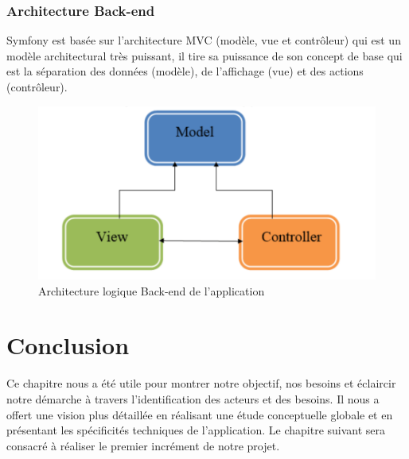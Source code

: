 \subsubsection{Architecture Back-end}

Symfony est basée sur l'architecture MVC (modèle, vue et contrôleur) qui est  
un modèle architectural très puissant, il
tire sa puissance de son concept de base qui est la séparation des données (modèle), de
l'affichage (vue) et des actions (contrôleur).
	\begin{figure}[H]
	\centering
	\includegraphics[scale=0.5]{archisym.PNG}
	\caption{Architecture logique Back-end de l'application}
	\label{Architecture logique Back-end de l'application}
\end{figure} 

\section{Conclusion}
Ce chapitre nous a été utile pour montrer notre objectif, nos besoins et éclaircir notre
démarche à travers l'identification des acteurs et des besoins. Il nous a offert une vision plus détaillée en réalisant  une étude conceptuelle globale et en présentant les spécificités techniques de l'application. Le chapitre suivant sera consacré à réaliser le premier incrément de notre projet.